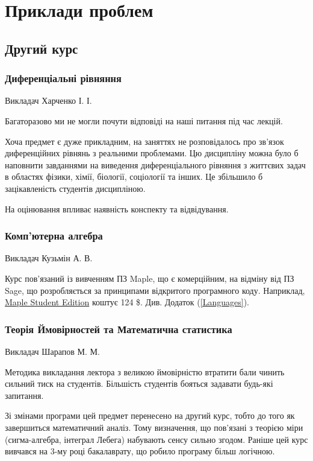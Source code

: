 \documentclass[14pt, a4paper]{extarticle}  %
\begin{document}
\section{Приклади проблем}
\subsection{Другий курс}

\subsubsection{Диференціальні рівняння}
Викладач Харченко І. І.  

Багаторазово ми не могли почути відповіді на наші питання під час лекцій.

Хоча предмет є дуже прикладним, на заняттях не розповідалось про зв'язок диференційних рівнянь з реальними проблемами. Цю дисципліну можна було б наповнити завданнями на виведення диференціального рівняння з життєвих задач в областях фізики, хімії, біології, соціології та інших. Це збільшило б зацікавленість студентів дисципліною. 

На оцінювання впливає наявність конспекту та відвідування. 

\subsubsection{Комп'ютерна алгебра} 
Викладач Кузьмін А. В. 

Курс пов'язаний із вивченням ПЗ Maple, що є комерційним, на відміну від ПЗ Sage, що розробляється за принципами відкритого програмного коду. Наприклад, \href{https://webstore.maplesoft.com/catalog.aspx}{Maple Student Edition} коштує 124 \$. Див. Додаток (\ref{Languages}). 

\subsubsection{Теорія Ймовірностей та Математична статистика}
Викладач Шарапов М. М. 

Методика викладання лектора з великою ймовірністю втратити бали чинить сильний тиск на студентів. Більшість студентів бояться задавати будь-які запитання. 

Зі змінами програми цей предмет перенесено на другий курс, тобто до того як завершиться математичний аналіз. Тому визначення, що пов'язані з теорією міри (сигма-алгебра, інтеграл Лебега) набувають сенсу сильно згодом. Раніше цей курс вивчався на 3-му році бакалаврату, що робило програму більш логічною. 
\end{document}
